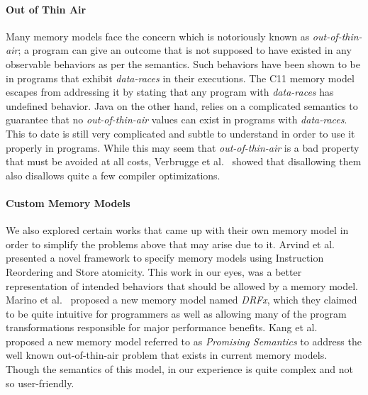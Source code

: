     \paragraph{Out of Thin Air }
    Many memory models face the concern which is notoriously known as \textit{out-of-thin-air}; a program can give an outcome that is not supposed to have existed in any observable behaviors as per the semantics. %
    Such behaviors have been shown to be in programs that exhibit \textit{data-races} in their executions.
    The C11 memory model \cite{C11MM} escapes from addressing it by stating that any program with \textit{data-races} has undefined behavior.
    Java on the other hand, relies on a complicated semantics to guarantee that no \textit{out-of-thin-air} values can exist in programs with \textit{data-races}. This to date is still very complicated and subtle to understand in order to use it properly in programs. 
    While this may seem that \textit{out-of-thin-air} is a bad property that must be avoided at all costs, Verbrugge et al.~\cite{Verbrugge} showed that disallowing them also disallows quite a few compiler optimizations.

    \paragraph{Custom Memory Models}
    We also explored certain works that came up with their own memory model in order to simplify the problems above that may arise due to it. 
    Arvind et al.~\cite{Arvind} presented a novel framework to specify memory models using Instruction Reordering and Store atomicity. This work in our eyes, was a better representation of intended behaviors that should be allowed by a memory model. 
    Marino et al.~\cite{Marino} proposed a new memory model named \textit{DRFx}, which they claimed to be quite intuitive for programmers as well as allowing many of the program transformations responsible for major performance benefits.
    Kang et al.~\cite{Kang} proposed a new memory model referred to as \textit{Promising Semantics} to address the well known out-of-thin-air problem that exists in current memory models. Though the semantics of this model, in our experience is quite complex and not so user-friendly.
